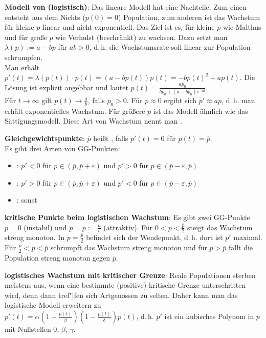 \textbf{Modell von  (logistisch)}:
Das lineare Modell hat eine Nachteile.
Zum einen entsteht aus dem Nichts ($p(0) = 0$) Population,
zum anderen ist das Wachstum für kleine $p$ linear und nicht exponentiell.
Das Ziel ist es, für kleine $p$ wie Malthus und für große $p$ wie Verhulst (beschränkt) zu wachsen.
Dazu setzt man $\lambda(p) := a - bp$ für $ab > 0$, d.\,h. die Wachstumsrate soll linear zur
Population schrumpfen.\\
Man erhält $p'(t) = \lambda(p(t)) \cdot p(t) = (a - bp(t)) p(t) = -bp(t)^2 + ap(t)$.
Die Lösung ist explizit angebbar und lautet $p(t) = \frac{ap_0}{bp_0 + (a-bp_0) e^{-at}}$.\\
Für $t \to \infty$ gilt $p(t) \to \frac{a}{b}$, falls $p_0 > 0$.
Für $p \approx 0$ ergibt sich $p' \approx ap$, d.\,h. man erhält exponentielles Wachstum.
Für größere $p$ ist das Modell ähnlich wie das Sättigungsmodell.
Diese Art von Wachstum nennt man .

\textbf{Gleichgewichtspunkte}:
$\overline{p}$ heißt , falls $p'(t) = 0$ für
$p(t) = \overline{p}$.\\
Es gibt drei Arten von GG-Punkten:
\begin{itemize}
    \item
    :
    $p' < 0$ für $p \in (\overline{p}, \overline{p} + \varepsilon)$ und
    $p' > 0$ für $p \in (\overline{p} - \varepsilon, \overline{p})$
    
    \item
    :
    $p' > 0$ für $p \in (\overline{p}, \overline{p} + \varepsilon)$ und
    $p' < 0$ für $p \in (\overline{p} - \varepsilon, \overline{p})$
    
    \item
    :
    sonst
\end{itemize}

\textbf{kritische Punkte beim logistischen Wachstum}:
Es gibt zwei GG-Punkte $p = 0$ (instabil) und $p = \overline{p} := \frac{a}{b}$ (attraktiv).
Für $0 < p < \frac{\overline{p}}{2}$ steigt das Wachstum streng monoton.
In $p = \frac{\overline{p}}{2}$ befindet sich der Wendepunkt, d.\,h. dort ist $p'$ maximal.
Für $\frac{\overline{p}}{2} < p < \overline{p}$ schrumpft das Wachstum streng monoton
und für $p > \overline{p}$ fällt die Population streng monoton gegen $\overline{p}$.

\linie

\textbf{logistisches Wachstum mit kritischer Grenze}:
Reale Populationen sterben meistens aus, wenn eine bestimmte (positive) kritische Grenze
unterschritten wird, denn dann tref"|fen sich Artgenossen zu selten.
Daher kann man das logistische Modell erweitern zu\\
$p'(t) = \alpha (1 - \frac{p(t)}{\beta}) (1 - \frac{p(t)}{\delta}) p(t)$,
d.\,h. $p'$ ist ein kubisches Polynom in $p$ mit Nullstellen $0$, $\beta$, $\gamma$.

